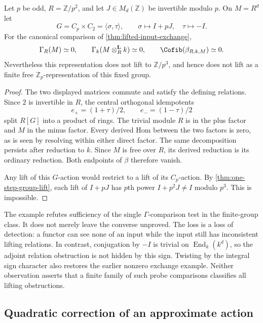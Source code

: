 \begin{theorem}\label{thm:blind-exchange}
Let $p$ be odd, $R=\mathbb Z/p^2$, and let $J\in M_d(\mathbb Z)$ be invertible modulo $p$. On $M=R^d$ let
\[
 G=C_p\times C_2=\langle\sigma,\tau\rangle,
 \qquad \sigma\mapsto I+pJ,\quad \tau\mapsto-I.
\]
For the canonical comparison of \cref{thm:lifted-input-exchange},
\[
 \Gamma_R(M)\simeq0,
 \qquad \Gamma_k(M\otimes_R^{\mathbf L}k)\simeq0,
 \qquad \Cofib(\beta_{R,k,M})\simeq0.
\]
Nevertheless this representation does not lift to $\mathbb Z/p^3$, and hence does not lift as a finite free $\mathbb Z_p$-representation of this fixed group.
\end{theorem}
\begin{proof}
The two displayed matrices commute and satisfy the defining relations. Since $2$ is invertible in $R$, the central orthogonal idempotents
\[
 e_+=(1+\tau)/2,\qquad e_-=(1-\tau)/2
\]
split $R[G]$ into a product of rings. The trivial module $R$ is in the plus factor and $M$ in the minus factor. Every derived Hom between the two factors is zero, as is seen by resolving within either direct factor. The same decomposition persists after reduction to $k$. Since $M$ is free over $R$, its derived reduction is its ordinary reduction. Both endpoints of $\beta$ therefore vanish.

Any lift of this $G$-action would restrict to a lift of its $C_p$-action. By \cref{thm:one-step-group-lift}, each lift of $I+pJ$ has $p$th power $I+p^2J\ne I$ modulo $p^3$. This is impossible.
\end{proof}

The example refutes sufficiency of the single $\Gamma$-comparison test in the finite-group class. It does not merely leave the converse unproved. The loss is a loss of detection: a functor can see none of an input while the input still has inconsistent lifting relations. In contrast, conjugation by $-I$ is trivial on $\operatorname{End}_k(k^d)$, so the adjoint relation obstruction is not hidden by this sign. Twisting by the integral sign character also restores the earlier nonzero exchange example. Neither observation asserts that a finite family of such probe comparisons classifies all lifting obstructions.

\subsection{Quadratic correction of an approximate action}


